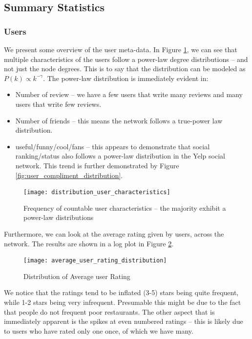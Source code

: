 \documentclass[letterpaper, 10 pt, conference]{ieeeconf}  %
\begin{document}
\subsection{Summary Statistics}
\subsubsection{Users}
We present some overview of the user meta-data. In Figure \ref{fig:user_characteristics}, we can see that multiple characteristics of the users follow a power-law degree distributions -- and not just the node degrees. This is to say that the distribution can be modeled as $P(k) \propto k^{-\gamma}$. The power-law distribution is immediately evident in:

\begin{itemize}
\item Number of review -- we have a few users that write many reviews and many users that write few reviews.
\item Number of friends -- this means the network follows a true-power law distribution.
\item useful/funny/cool/fans -- this appears to demonstrate that social ranking/status also follows a power-law distribution in the Yelp social network. This trend is further demonstrated by Figure \ref{fig:user_compliment_distribution}.
\end{itemize} 

\begin{figure}[h!]
\centering
\texttt{[image: distribution\_user\_characteristics]}
\caption{Frequency of countable user characteristics -- the majority exhibit a power-law distributions}
\label{fig:user_characteristics}
\end{figure}

Furthermore, we can look at the average rating given by users, across the network. The results are shown in a log plot in Figure \ref{fig:user_rating_distribution}.

\begin{figure}[h!]
\centering
\texttt{[image: average\_user\_rating\_distribution]}
\caption{Distribution of Average user Rating}
\label{fig:user_rating_distribution}
\end{figure}

We notice that the ratings tend to be inflated (3-5) stars being quite frequent, while 1-2 stars being very infrequent. Presumable this might be due to the fact that people do not frequent poor restaurants. The other aspect that is immediately apparent is the spikes at even numbered ratings -- this is likely due to users who have rated only one once, of which we have many.
\end{document}
